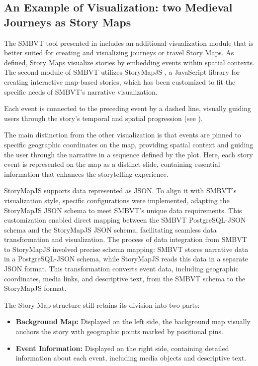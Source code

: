 \subsection{An Example of Visualization: two Medieval Journeys as Story Maps}\label{VII-subsec:imago-visualization}

The SMBVT tool presented in  includes an additional visualization module that is better suited for creating and visualizing journeys or travel Story Maps. As defined, Story Maps visualize stories by embedding events within spatial contexts. The second module of SMBVT utilizes StoryMapJS \cite{knightlabStoryMapJS}, a JavaScript library for creating interactive map-based stories, which has been customized to fit the specific needs of SMBVT’s narrative visualization.


Each event is connected to the preceding event by a dashed line, visually guiding users through the story’s temporal and spatial progression (see ).

The main distinction from the other visualization is that events are pinned to specific geographic coordinates on the map, providing spatial context and guiding the user through the narrative in a sequence defined by the plot. Here, each story event is represented on the map as a distinct slide, containing essential information that enhances the storytelling experience.

StoryMapJS supports data represented as JSON. To align it with SMBVT’s visualization style, specific configurations were implemented, adapting the StoryMapJS JSON schema to meet SMBVT’s unique data requirements. This customization enabled direct mapping between the SMBVT PostgreSQL-JSON schema and the StoryMapJS JSON schema, facilitating seamless data transformation and visualization. The process of data integration from SMBVT to StoryMapJS involved precise schema mapping: SMBVT stores narrative data in a PostgreSQL-JSON schema, while StoryMapJS reads this data in a separate JSON format. This transformation converts event data, including geographic coordinates, media links, and descriptive text, from the SMBVT schema to the StoryMapJS format.

The Story Map structure still retains its division into two parts:
\begin{itemize}
    \item \textbf{Background Map:} Displayed on the left side, the background map visually anchors the story with geographic points marked by positional pins.
    \item \textbf{Event Information:} Displayed on the right side, containing detailed information about each event, including media objects and descriptive text.
\end{itemize}


